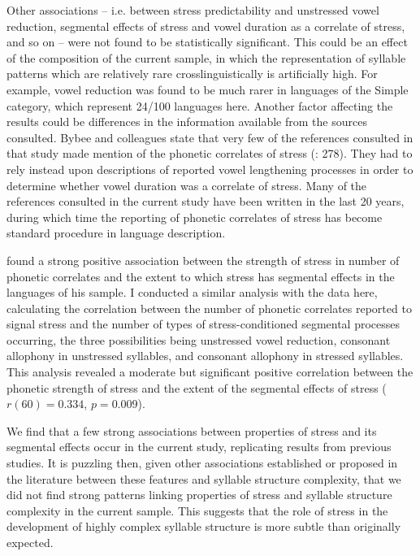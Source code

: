   Other associations -- i.e. between stress predictability and unstressed vowel reduction, segmental effects of stress and vowel duration as a correlate of stress, and so on -- were not found to be statistically significant. This could be an effect of the composition of the current sample, in which the representation of syllable patterns which are relatively rare crosslinguistically is artificially high. For example, vowel reduction was found to be much rarer in languages of the Simple category, which represent 24/100 languages here. Another factor affecting the results could be differences in the information available from the sources consulted. Bybee and colleagues state that very few of the references consulted in that study made mention of the phonetic correlates of stress (\citeyear{BybeeEtAl1998}: 278). They had to rely instead upon descriptions of reported vowel lengthening processes in order to determine whether vowel duration was a correlate of stress. Many of the references consulted in the current study have been written in the last 20 years, during which time the reporting of phonetic correlates of stress has become standard procedure in language description.

  \citet{Schiering2007} found a strong positive association between the strength of stress in number of phonetic correlates and the extent to which stress has segmental effects in the languages of his sample. I conducted a similar analysis with the data here, calculating the correlation between the number of phonetic correlates reported to signal stress and the number of types of stress-conditioned segmental processes occurring, the three possibilities being unstressed vowel reduction, consonant allophony in unstressed syllables, and consonant allophony in stressed syllables. This analysis revealed a moderate but significant positive correlation between the phonetic strength of stress and the extent of the segmental effects of stress ($r(60) = 0.334$, $p = 0.009$).

  We find that a few strong associations between properties of stress and its segmental effects occur in the current study, replicating results from previous studies. It is puzzling then, given other associations established or proposed in the literature between these features and syllable structure complexity, that we did not find strong patterns linking properties of stress and syllable structure complexity in the current sample. This suggests that the role of stress in the development of highly complex syllable structure is more subtle than originally expected.

